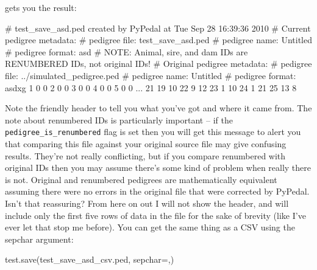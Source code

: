 \documentclass[
  letterpaper,
  DIV=11,
  numbers=noendperiod]{scrreprt}
\newenvironment{Shaded}{\begin{snugshade}}{\end{snugshade}}
\newcommand{\AlertTok}[1]{\textcolor[rgb]{0.68,0.00,0.00}{#1}}
\newcommand{\CommentTok}[1]{\textcolor[rgb]{0.37,0.37,0.37}{#1}}
\newcommand{\DecValTok}[1]{\textcolor[rgb]{0.68,0.00,0.00}{#1}}
\newcommand{\NormalTok}[1]{\textcolor[rgb]{0.00,0.23,0.31}{#1}}
\newcommand{\OperatorTok}[1]{\textcolor[rgb]{0.37,0.37,0.37}{#1}}
\newcommand{\StringTok}[1]{\textcolor[rgb]{0.13,0.47,0.30}{#1}}
\begin{document}
gets you the result:

\begin{Shaded}
\begin{Highlighting}[]
\CommentTok{\# test\_save\_asd.ped created by PyPedal at Tue Sep 28 16:39:36 2010}
\CommentTok{\# Current pedigree metadata:}
\CommentTok{\#       pedigree file: test\_save\_asd.ped}
\CommentTok{\#       pedigree name: Untitled}
\CommentTok{\#       pedigree format: asd}
\CommentTok{\#       }\AlertTok{NOTE}\CommentTok{: Animal, sire, and dam IDs are RENUMBERED IDs, not original IDs!}
\CommentTok{\# Original pedigree metadata:}
\CommentTok{\#       pedigree file: ../simulated\_pedigree.ped}
\CommentTok{\#       pedigree name: Untitled}
\CommentTok{\#       pedigree format: asdxg}
\DecValTok{1} \DecValTok{0} \DecValTok{0}
\DecValTok{2} \DecValTok{0} \DecValTok{0}
\DecValTok{3} \DecValTok{0} \DecValTok{0}
\DecValTok{4} \DecValTok{0} \DecValTok{0}
\DecValTok{5} \DecValTok{0} \DecValTok{0}
\NormalTok{...}
\DecValTok{21} \DecValTok{19} \DecValTok{10}
\DecValTok{22} \DecValTok{9} \DecValTok{12}
\DecValTok{23} \DecValTok{1} \DecValTok{10}
\DecValTok{24} \DecValTok{1} \DecValTok{21}
\DecValTok{25} \DecValTok{13} \DecValTok{8}
\end{Highlighting}
\end{Shaded}

Note the friendly header to tell you what you've got and where it came
from. The note about renumbered IDs is particularly important -- if the
\texttt{pedigree\_is\_renumbered} flag is set then you will get this
message to alert you that comparing this file against your original
source file may give confusing results. They're not really conflicting,
but if you compare renumbered with original IDs then you may assume
there's some kind of problem when really there is not. Original and
renumbered pedigrees are mathematically equivalent assuming there were
no errors in the original file that were corrected by PyPedal. Isn't
that reassuring? From here on out I will not show the header, and will
include only the first five rows of data in the file for the sake of
brevity (like I've ever let that stop me before). You can get the same
thing as a CSV using the sepchar argument:

\begin{Shaded}
\begin{Highlighting}[]
\NormalTok{test.save(}\StringTok{\textquotesingle{}test\_save\_asd\_csv.ped\textquotesingle{}}\NormalTok{, sepchar}\OperatorTok{=}\StringTok{\textquotesingle{},\textquotesingle{}}\NormalTok{)}
\end{Highlighting}
\end{Shaded}
\end{document}
